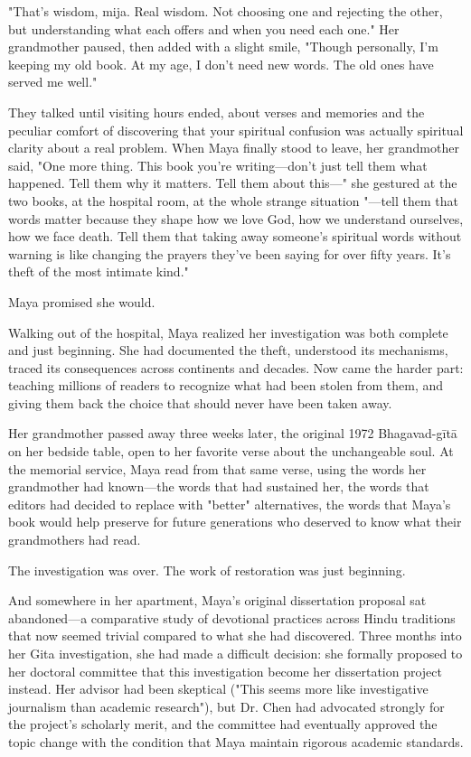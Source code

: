 \documentclass[12pt,twoside]{book}
\begin{document}
"That's wisdom, mija. Real wisdom. Not choosing one and rejecting the other, but understanding what each offers and when you need each one." Her grandmother paused, then added with a slight smile, "Though personally, I'm keeping my old book. At my age, I don't need new words. The old ones have served me well."

They talked until visiting hours ended, about verses and memories and the peculiar comfort of discovering that your spiritual confusion was actually spiritual clarity about a real problem. When Maya finally stood to leave, her grandmother said, "One more thing. This book you're writing—don't just tell them what happened. Tell them why it matters. Tell them about this—" she gestured at the two books, at the hospital room, at the whole strange situation "—tell them that words matter because they shape how we love God, how we understand ourselves, how we face death. Tell them that taking away someone's spiritual words without warning is like changing the prayers they've been saying for over fifty years. It's theft of the most intimate kind."

Maya promised she would.

Walking out of the hospital, Maya realized her investigation was both complete and just beginning. She had documented the theft, understood its mechanisms, traced its consequences across continents and decades. Now came the harder part: teaching millions of readers to recognize what had been stolen from them, and giving them back the choice that should never have been taken away.

Her grandmother passed away three weeks later, the original 1972 Bhagavad-gītā on her bedside table, open to her favorite verse about the unchangeable soul. At the memorial service, Maya read from that same verse, using the words her grandmother had known—the words that had sustained her, the words that editors had decided to replace with "better" alternatives, the words that Maya's book would help preserve for future generations who deserved to know what their grandmothers had read.

The investigation was over. The work of restoration was just beginning.

And somewhere in her apartment, Maya's original dissertation proposal sat abandoned—a comparative study of devotional practices across Hindu traditions that now seemed trivial compared to what she had discovered. Three months into her Gita investigation, she had made a difficult decision: she formally proposed to her doctoral committee that this investigation become her dissertation project instead. Her advisor had been skeptical ("This seems more like investigative journalism than academic research"), but Dr. Chen had advocated strongly for the project's scholarly merit, and the committee had eventually approved the topic change with the condition that Maya maintain rigorous academic standards.
\end{document}
